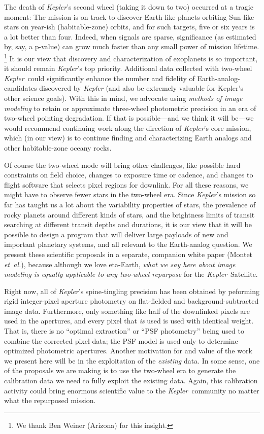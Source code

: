 \documentclass[letterpaper,12pt,whitepaper]{haastex}
\newcommand{\foreign}[1]{\textit{#1}}
\newcommand{\etal}{\foreign{et~al.}}
\newcommand{\observatory}[1]{\textsl{#1}}
\newcommand{\Kepler}{\observatory{Kepler}}
\begin{document}
The death of \Kepler's second wheel (taking it down to two)
  occurred at a tragic moment:
The mission is on track to discover Earth-like planets
  orbiting Sun-like stars on year-ish (habitable-zone) orbits,
  and for such targets, five or six years is a lot better than four.
Indeed, when signals are sparse, significance
  (as estimated by, say, a p-value)
  can grow much faster than any small power of mission lifetime.%
  \footnote{We thank Ben Weiner (Arizona) for this insight.}
It is our view that discovery and characterization of exoplanets is so important,
  it should remain \Kepler's top priority.
Additional data collected with two-wheel \Kepler\ could
  significantly enhance the number and fidelity of Earth-analog-candidates
  discovered by \Kepler %
  (and also be extremely valuable for Kepler’s other science goals).
With this in mind, we advocate using \emph{methods of image modeling} to retain
  or approximate three-wheel photometric precision
  in an era of two-wheel pointing degradation.
If that is possible---and we think it will be---we would recommend continuing work
  along the direction of \Kepler's core mission,
  which (in our view) is to continue finding and characterizing
  Earth analogs and other habitable-zone oceany rocks.

Of course the two-wheel mode will bring other challenges, like
  possible hard constraints on field choice,
  changes to exposure time or cadence,
  and changes to flight software that selects pixel regions for downlink.
For all these reasons, we might have to observe fewer stars in the two-wheel era.
Since \Kepler's mission so far has taught us a lot about the variability
  properties of stars,
  the prevalence of rocky planets around different kinds of stars,
  and the brightness limits of transit searching at different transit depths and durations,
  it is our view that it will be possible to design a program that will deliver
  large payloads of new and important planetary systems,
  and all relevant to the Earth-analog question.
We present these scientific proposals in a separate, companion white paper (Montet \etal),
  because although we love eta-Earth,
  \emph{what we say here about image modeling is equally applicable
  to any two-wheel repurpose} for the \Kepler~Satellite.

Right now, all of \Kepler's spine-tingling precision
  has been obtained by peforming rigid integer-pixel aperture photometry
  on flat-fielded and background-subtracted image data.
Furthermore, only something like half of the downlinked pixels are used in the apertures,
  and every pixel that \emph{is} used is used with identical weight.
That is, there is no ``optimal extraction'' or ``PSF photometry'' being
  used to combine the corrected pixel data;
  the PSF model is used only to determine optimized photometric apertures.
Another motivation for and value of the work we present here will be
  in the exploitation of the \emph{existing} data.
In some sense, one of the proposals we are making is to use the two-wheel era
  to generate the calibration data we need to fully exploit the existing data.
Again, this calibration activity could bring enormous scientific value to the \Kepler\ community
  no matter what the repurposed mission.
\end{document}
